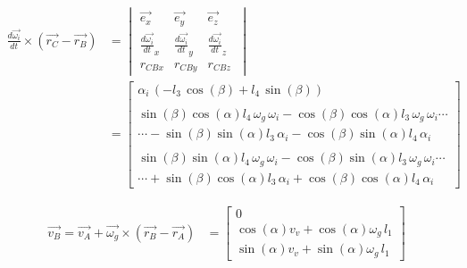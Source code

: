 \begin{equation*}
\begin{split}
\frac{d\overrightarrow{\omega_i}}{dt}\times(\overrightarrow{r_{C}}-\overrightarrow{r_{B}})
&=	\begin{vmatrix}
	\overrightarrow{e_{x}} & \overrightarrow{e_{y}} & \overrightarrow{e_{z}}\\
	\frac{d\overrightarrow{\omega_i}}{dt}_{x} & \frac{d\overrightarrow{\omega_i}}{dt}_{y} & \frac{d\overrightarrow{\omega_i}}{dt}_{z}\\
	r_{CBx} & r_{CBy} & r_{CBz}\
	\end{vmatrix}\\
&=	\begin{bmatrix}
	\alpha_{i}\, \left( -l_{3}\,\cos \left( \beta \right) +l_{4}\,\sin \left( \beta \right)  \right) \\
	\\
	\sin \left( \beta \right) \cos \left( \alpha\right) l_{4}\,\omega_{g}\,\omega_{i}-\cos \left( \beta \right) \cos\left( \alpha \right) l_{3}\,\omega_{g}\,\omega_{i}\cdots\\
	\cdots-\sin \left( \beta\right) \sin \left( \alpha \right) l_{3}\,\alpha_{i}-\cos \left( \beta \right) \sin \left( \alpha \right) l_{4}\,\alpha_{i}\\
	\\
	\sin \left( \beta \right) \sin \left( \alpha\right) l_{4}\,\omega_{g}\,\omega_{i}-\cos \left( \beta \right) \sin\left( \alpha \right) l_{3}\,\omega_{g}\,\omega_{i} \cdots\\
	\cdots +\sin \left( \beta\right) \cos \left( \alpha \right) l_{3}\,\alpha_{i}+\cos \left( \beta \right) \cos \left( \alpha \right) l_{4}\,\alpha_{i}\
	\end{bmatrix}
\end{split}
\end{equation*}

\begin{equation*}
\begin{split}
\overrightarrow{v_{B}}=\overrightarrow{v_{A}}+\overrightarrow{\omega_{g}}\times(\overrightarrow{r_{B}}-\overrightarrow{r_{A}})
&=	\begin{bmatrix}
	0\\
	\cos \left( \alpha \right) v_{v}+\cos \left( \alpha \right) \omega_{g}\,l_{1}\\
	\sin \left( \alpha \right) v_{v}+\sin \left( \alpha \right) \omega_{g}\,l_{1}\
	\end{bmatrix}
\end{split}
\end{equation*}

